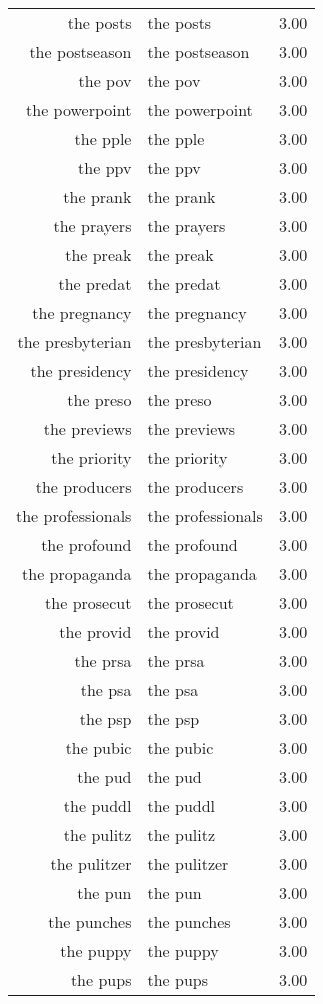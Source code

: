 \begin{table}[ht]
\begin{tabular}{rlr}
  the posts & the posts & 3.00 \\ 
  the postseason & the postseason & 3.00 \\ 
  the pov & the pov & 3.00 \\ 
  the powerpoint & the powerpoint & 3.00 \\ 
  the pple & the pple & 3.00 \\ 
  the ppv & the ppv & 3.00 \\ 
  the prank & the prank & 3.00 \\ 
  the prayers & the prayers & 3.00 \\ 
  the preak & the preak & 3.00 \\ 
  the predat & the predat & 3.00 \\ 
  the pregnancy & the pregnancy & 3.00 \\ 
  the presbyterian & the presbyterian & 3.00 \\ 
  the presidency & the presidency & 3.00 \\ 
  the preso & the preso & 3.00 \\ 
  the previews & the previews & 3.00 \\ 
  the priority & the priority & 3.00 \\ 
  the producers & the producers & 3.00 \\ 
  the professionals & the professionals & 3.00 \\ 
  the profound & the profound & 3.00 \\ 
  the propaganda & the propaganda & 3.00 \\ 
  the prosecut & the prosecut & 3.00 \\ 
  the provid & the provid & 3.00 \\ 
  the prsa & the prsa & 3.00 \\ 
  the psa & the psa & 3.00 \\ 
  the psp & the psp & 3.00 \\ 
  the pubic & the pubic & 3.00 \\ 
  the pud & the pud & 3.00 \\ 
  the puddl & the puddl & 3.00 \\ 
  the pulitz & the pulitz & 3.00 \\ 
  the pulitzer & the pulitzer & 3.00 \\ 
  the pun & the pun & 3.00 \\ 
  the punches & the punches & 3.00 \\ 
  the puppy & the puppy & 3.00 \\ 
  the pups & the pups & 3.00 \\ 

\end{tabular}
\end{table}
